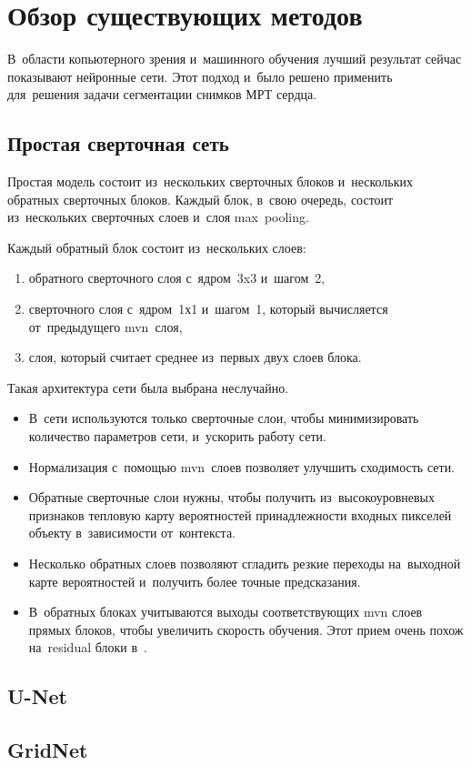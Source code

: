 \section{Обзор существующих методов}

В~области копьютерного зрения и~машинного обучения лучший результат сейчас показывают нейронные сети. Этот подход и~было решено применить для~решения задачи сегментации снимков МРТ сердца.

\subsection{Простая сверточная сеть}
 
Простая модель состоит из~нескольких сверточных блоков и~нескольких обратных сверточных блоков. Каждый блок, в~свою очередь, состоит из~нескольких сверточных слоев и~слоя max~pooling. 

Каждый обратный блок состоит из~нескольких слоев:

\begin{enumerate}
	\item обратного сверточного слоя с~ядром~3x3 и~шагом~2,
	\item сверточного слоя с~ядром~1х1 и~шагом~1, который вычисляется от~предыдущего mvn~слоя,
	\item слоя, который считает среднее из~первых двух слоев блока.
\end{enumerate}

Такая архитектура сети была выбрана неслучайно.

\begin{itemize}
	\item В~сети используются только сверточные слои, чтобы минимизировать количество параметров сети, и~ускорить работу сети.
	\item Нормализация с~помощью mvn~слоев позволяет улучшить сходимость сети.
	\item Обратные сверточные слои нужны, чтобы получить из~высокоуровневых признаков тепловую карту вероятностей принадлежности входных пикселей объекту в~зависимости от~контекста.
	\item Несколько обратных слоев позволяют сгладить резкие переходы на~выходной карте вероятностей и~получить более точные предсказания.
	\item В~обратных блоках учитываются выходы соответствующих mvn слоев прямых блоков, чтобы увеличить скорость обучения. Этот прием очень похож на~residual блоки в~\cite{resnet}.
 \end{itemize}

\subsection{U-Net}

\subsection{GridNet}
